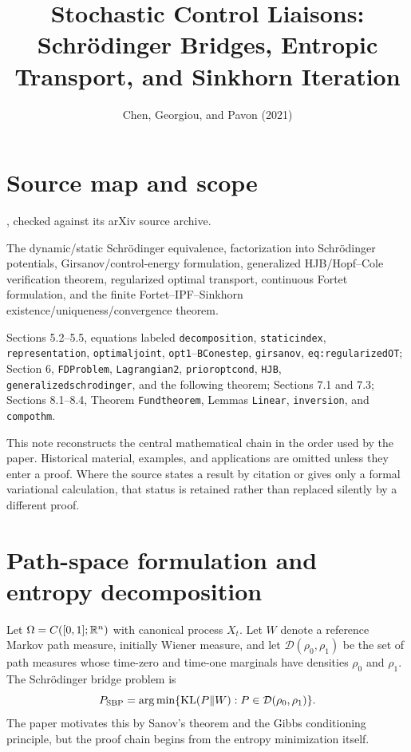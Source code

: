 
\title{Stochastic Control Liaisons: Schr\"odinger Bridges, Entropic Transport, and Sinkhorn Iteration}
\author{}
\date{Chen, Georgiou, and Pavon (2021)}

\maketitle

\section*{Source map and scope}
\begin{sloppypar}
\begin{sourceguide}
\item[Primary source] , checked against its arXiv source archive.
\item[Target chain] The dynamic/static Schr\"odinger equivalence, factorization into Schr\"odinger potentials, Girsanov/control-energy formulation, generalized HJB/Hopf--Cole verification theorem, regularized optimal transport, continuous Fortet formulation, and the finite Fortet--IPF--Sinkhorn existence/uniqueness/convergence theorem.
\item[Source anchors] Sections 5.2--5.5, equations labeled \texttt{decomposition}, \texttt{staticindex}, \texttt{representation}, \texttt{optimaljoint}, \texttt{opt1}--\texttt{BConestep}, \texttt{girsanov}, \texttt{eq:regularizedOT}; Section 6, \texttt{FDProblem}, \texttt{Lagrangian2}, \texttt{prioroptcond}, \texttt{HJB}, \texttt{generalizedschrodinger}, and the following theorem; Sections 7.1 and 7.3; Sections 8.1--8.4, Theorem \texttt{Fundtheorem}, Lemmas \texttt{Linear}, \texttt{inversion}, and \texttt{compothm}.
\end{sourceguide}
\end{sloppypar}

This note reconstructs the central mathematical chain in the order used by the paper.  Historical
material, examples, and applications are omitted unless they enter a proof.  Where the source
states a result by citation or gives only a formal variational calculation, that status is retained
rather than replaced silently by a different proof.

\section{Path-space formulation and entropy decomposition}
Let $\Omega=C([0,1];\mathbb{R}^n)$ with canonical process $X_t$.  Let $W$ denote a reference Markov path
measure, initially Wiener measure, and let $\mathcal D(\rho_0,\rho_1)$ be the set of path measures
whose time-zero and time-one marginals have densities $\rho_0$ and $\rho_1$.
The Schr\"odinger bridge problem is
\begin{equation}
 P_{\rm SBP}
 =\operatorname*{arg\,min}\{\mathrm{KL}(P\|W):P\in\mathcal D(\rho_0,\rho_1)\}.
 \label{eq:CGP-bridge}
\end{equation}
The paper motivates this by Sanov's theorem and the Gibbs conditioning principle, but the proof
chain begins from the entropy minimization itself.

